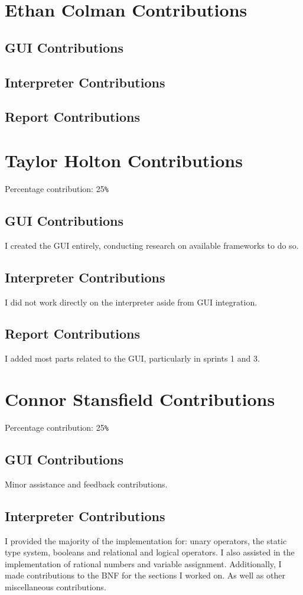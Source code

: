 \documentclass[a4paper, oneside, 11pt]{report}
\begin{document}
    \section{Ethan Colman Contributions}
    \subsection{GUI Contributions}
    \subsection{Interpreter Contributions}
    \subsection{Report Contributions}

    \section{Taylor Holton Contributions}
    Percentage contribution: 25\verb|%|
    \subsection{GUI Contributions}
    I created the GUI entirely, conducting research on available frameworks to do so.
    \subsection{Interpreter Contributions}
    I did not work directly on the interpreter aside from GUI integration.
    \subsection{Report Contributions}
    I added most parts related to the GUI, particularly in sprints 1 and 3.

    \section{Connor Stansfield Contributions}
    Percentage contribution: 25\verb|%|
    \subsection{GUI Contributions}
    Minor assistance and feedback contributions.
    \subsection{Interpreter Contributions}
    I provided the majority of the implementation for: unary operators, the static type system, booleans and relational and logical operators.
    I also assisted in the implementation of rational numbers and variable assignment.
    Additionally, I made contributions to the BNF for the sections I worked on.
    As well as other miscellaneous contributions.
\end{document}
